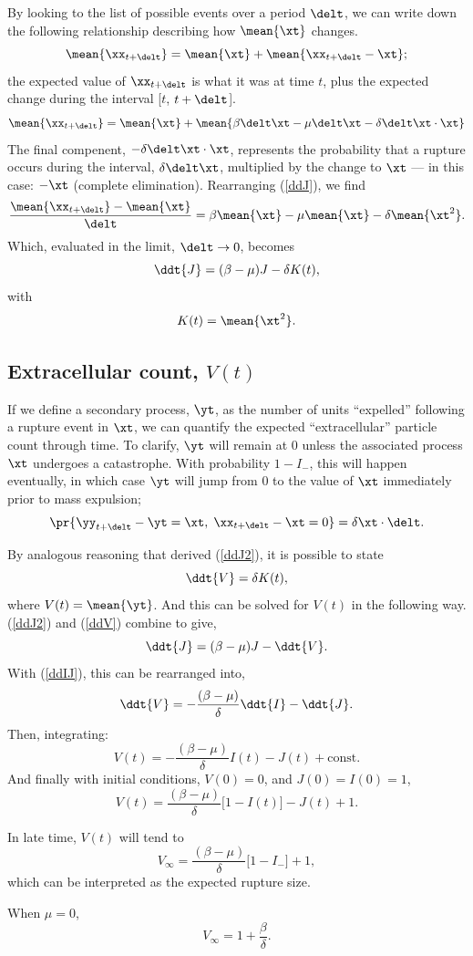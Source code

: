 By looking to the list of possible events over a period $\delt$, we can write down the following relationship describing how $\mean{\xt}$ changes.
$$\mean{\xx_{t+\delt}} = \mean{\xt} + \mean{\xx_{t+\delt}-\xt};$$
the expected value of $\xx_{t+\delt}$ is what it was at time $t$, plus the expected change during the interval [$t$, $t+\delt$].
\begin{equation}
\label{ddJ}
\mean{\xx_{t+\delt}} = \mean{\xt} + \mean{\beta\delt\xt - \mu\delt\xt - \delta\delt\xt\cdot\xt}
\end{equation}
The final compenent, $- \delta\delt\xt\cdot\xt$, represents the probability that a rupture occurs during the interval, $\delta\delt\xt$, multiplied by the change to $\xt$ --- in this case: $-\xt$ (complete elimination).
Rearranging (\ref{ddJ}), we find 
$$\frac{\mean{\xx_{t+\delt}} - \mean{\xt}}{\delt} = \beta\mean{\xt} - \mu\mean{\xt} - \delta \mean{\xt^2}.$$
Which, evaluated in the limit, $\delt \to 0$, becomes
\begin{equation}
\label{ddJ2}
\ddt{J} = (\beta - \mu) J - \delta K(t),
\end{equation}
with
\begin{equation*}
K(t) = \mean{\xt^2}.
\end{equation*}


\subsection{Extracellular count, $V(t)$}

If we define a secondary process, $\yt$, as the number of units ``expelled'' following a rupture event in $\xt$, we can quantify the expected ``extracellular'' particle count through time. To clarify, $\yt$ will remain at 0 unless the associated process $\xt$ undergoes a catastrophe. With probability $1-I_-$, this will happen eventually, in which case $\yt$ will jump from 0 to the value of $\xt$ immediately prior to mass expulsion;
$$\pr{\yy_{t+\delt}-\yt = \xt,\; \xx_{t+\delt}-\xt=0} = \delta\xt\cdot\delt.$$



\noindent
By analogous reasoning that derived (\ref{ddJ2}), it is possible to state
\begin{equation}
\label{ddV}
\ddt{V} =  \delta K(t),
\end{equation}
where $V(t) = \mean{\yt}$.
And this can be solved for $V(t)$ in the following way. (\ref{ddJ2}) and (\ref{ddV}) combine to give,
$$\ddt{J} = (\beta - \mu) J - \ddt{V}.$$
With (\ref{ddIJ}), this can be rearranged into,
$$\ddt{V} = -\frac{(\beta - \mu)}{\delta}\ddt{I} - \ddt{J}.$$ 
Then, integrating:
$$V(t) = -\frac{(\beta - \mu)}{\delta}I(t) - J(t) + \text{const}.$$
And finally with initial conditions, $V(0) = 0$, and $J(0)=I(0)=1$,
\begin{equation*}
\label{Voft}
V(t) = \frac{(\beta - \mu)}{\delta}\big[1-I(t)\big] -J(t)+1.
\end{equation*}




\noindent
In late time, $V(t)$ will tend to
$$V_{\infty} =  \frac{(\beta - \mu)}{\delta}\big[1-I_-\big] +1,$$
which can be interpreted as the expected rupture size. 

When $\mu = 0$,
$$V_\infty = 1 +\frac{\beta}{\delta}.$$
